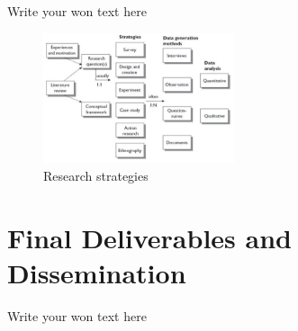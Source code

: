 \documentclass[11pt, a4paper]{article}
\begin{document}
Write your won text here

\begin{figure}[h]
    \center
    \includegraphics[width=0.5\textwidth]{research-strategies.png}
    \caption{Research strategies \cite{oates2005researching}}
    \label{fig:research_strategies}
\end{figure}

\section*{Final Deliverables and Dissemination}

Write your won text here

\printbibliography 
\end{document}
